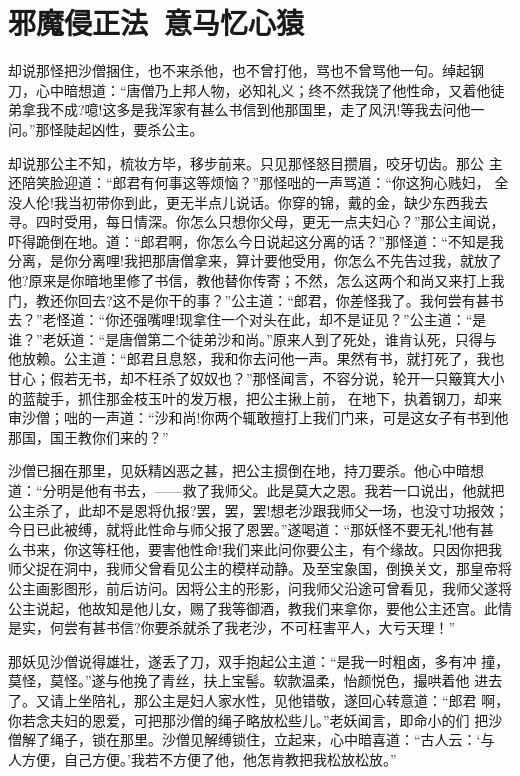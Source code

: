 \chapter{邪魔侵正法~意马忆心猿}

却说那怪把沙僧捆住，也不来杀他，也不曾打他，骂也不曾骂他一句。绰起钢
刀，心中暗想道：“唐僧乃上邦人物，必知礼义；终不然我饶了他性命，又着他徒
弟拿我不成?噫!这多是我浑家有甚么书信到他那国里，走了风汛!等我去问他一
问。”那怪陡起凶性，要杀公主。

却说那公主不知，梳妆方毕，移步前来。只见那怪怒目攒眉，咬牙切齿。那公
主还陪笑脸迎道：“郎君有何事这等烦恼？”那怪咄的一声骂道：“你这狗心贱妇，
全没人伦!我当初带你到此，更无半点儿说话。你穿的锦，戴的金，缺少东西我去
寻。四时受用，每日情深。你怎么只想你父母，更无一点夫妇心？”那公主闻说，
吓得跪倒在地。道：“郎君啊，你怎么今日说起这分离的话？”那怪道：“不知是我
分离，是你分离哩!我把那唐僧拿来，算计要他受用，你怎么不先告过我，就放了
他?原来是你暗地里修了书信，教他替你传寄；不然，怎么这两个和尚又来打上我
门，教还你回去?这不是你干的事？”公主道：“郎君，你差怪我了。我何尝有甚书
去？”老怪道：“你还强嘴哩!现拿住一个对头在此，却不是证见？”公主道：“是
谁？”老妖道：“是唐僧第二个徒弟沙和尚。”原来人到了死处，谁肯认死，只得与
他放赖。公主道：“郎君且息怒，我和你去问他一声。果然有书，就打死了，我也
甘心；假若无书，却不枉杀了奴奴也？”那怪闻言，不容分说，轮开一只簸箕大小
的蓝靛手，抓住那金枝玉叶的发万根，把公主揪上前，在地下，执着钢刀，却来
审沙僧；咄的一声道：“沙和尚!你两个辄敢擅打上我们门来，可是这女子有书到他
那国，国王教你们来的？”

沙僧已捆在那里，见妖精凶恶之甚，把公主掼倒在地，持刀要杀。他心中暗想
道：“分明是他有书去，——救了我师父。此是莫大之恩。我若一口说出，他就把
公主杀了，此却不是恩将仇报?罢，罢，罢!想老沙跟我师父一场，也没寸功报效；
今日已此被缚，就将此性命与师父报了恩罢。”遂喝道：“那妖怪不要无礼!他有甚
么书来，你这等枉他，要害他性命!我们来此问你要公主，有个缘故。只因你把我
师父捉在洞中，我师父曾看见公主的模样动静。及至宝象国，倒换关文，那皇帝将
公主画影图形，前后访问。因将公主的形影，问我师父沿途可曾看见，我师父遂将
公主说起，他故知是他儿女，赐了我等御酒，教我们来拿你，要他公主还宫。此情
是实，何尝有甚书信?你要杀就杀了我老沙，不可枉害平人，大亏天理！”

那妖见沙僧说得雄壮，遂丢了刀，双手抱起公主道：“是我一时粗卤，多有冲
撞，莫怪，莫怪。”遂与他挽了青丝，扶上宝髻。软款温柔，怡颜悦色，撮哄着他
进去了。又请上坐陪礼，那公主是妇人家水性，见他错敬，遂回心转意道：“郎君
啊，你若念夫妇的恩爱，可把那沙僧的绳子略放松些儿。”老妖闻言，即命小的们
把沙僧解了绳子，锁在那里。沙僧见解缚锁住，立起来，心中暗喜道：“古人云：‘与
人方便，自己方便。’我若不方便了他，他怎肯教把我松放松放。”

